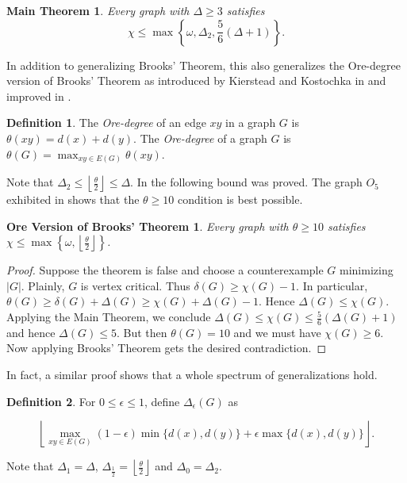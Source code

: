 \documentclass[12pt]{amsart}
\theoremstyle{plain}
\newtheorem*{OreBrooks}{Ore Version of Brooks' Theorem}
\newtheorem*{MainTheorem}{Main Theorem}
\theoremstyle{definition}
\newtheorem{defn}{Definition}
\theoremstyle{remark}
\newcommand{\card}[1]{\left|#1\right|}
\begin{document}
\begin{MainTheorem}
Every graph with $\Delta \geq 3$ satisfies \[\chi \leq \max \left\{\omega, \Delta_2, \frac{5}{6}(\Delta + 1)\right\}.\]
\end{MainTheorem}

In addition to generalizing Brooks' Theorem, this also generalizes the Ore-degree version of Brooks' Theorem as introduced by Kierstead and Kostochka in \cite{KK} and improved in \cite{DeltaCritical}.

\begin{defn}
The \emph{Ore-degree} of an edge $xy$ in a graph $G$ is $\theta(xy) = d(x) + d(y)$.  The \emph{Ore-degree} of a graph $G$ is $\theta(G) = \max_{xy \in E(G)}\theta(xy)$.
\end{defn}

Note that $\Delta_2 \leq \left\lfloor\frac{\theta}{2} \right \rfloor \leq \Delta$.  In \cite{DeltaCritical} the following bound was proved. The graph  $O_5$ exhibited in \cite{KK} shows that the $\theta \geq 10$ condition is best possible.

\begin{OreBrooks}
Every graph with $\theta \geq 10$ satisfies $\chi \leq \max \left\{\omega, \left\lfloor\frac{\theta}{2} \right \rfloor\right\}$.
\end{OreBrooks}
\begin{proof}
Suppose the theorem is false and choose a counterexample $G$ minimizing $\card{G}$.  Plainly, $G$ is vertex critical.  Thus $\delta(G) \geq \chi(G) - 1$.  In particular, $\theta(G) \geq \delta(G) + \Delta(G) \geq \chi(G) + \Delta(G) - 1$.  Hence $\Delta(G) \leq \chi(G)$.  Applying the Main Theorem, we conclude $\Delta(G) \leq \chi(G) \leq \frac{5}{6}(\Delta(G) + 1)$ and hence $\Delta(G) \leq 5$.  But then $\theta(G) = 10$ and we must have $\chi(G) \geq 6$.  Now applying Brooks' Theorem gets the desired contradiction.
\end{proof}

\noindent In fact, a similar proof shows that a whole spectrum of generalizations hold.

\begin{defn}
For $0 \leq \epsilon \leq 1$, define $\Delta_\epsilon(G)$ as

\[\left\lfloor\max_{xy \in E(G)} (1 - \epsilon)\min\{d(x), d(y)\} + \epsilon\max\{d(x), d(y)\}\right\rfloor.\]
\end{defn}

\noindent  Note that $\Delta_1 = \Delta$, $\Delta_{\frac12} = \left\lfloor\frac{\theta}{2} \right\rfloor$ and $\Delta_0 = \Delta_2$.
\end{document}
